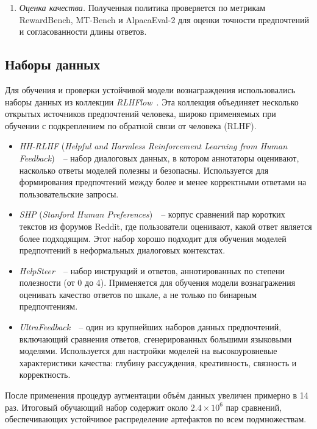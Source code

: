 \begin{enumerate}
  \item \emph{Оценка качества.}  
  Полученная политика проверяется по метрикам RewardBench, MT-Bench и AlpacaEval-2 для оценки точности предпочтений и согласованности длины ответов.
\end{enumerate}

\subsection{Наборы данных}

Для обучения и проверки устойчивой модели вознаграждения использовались наборы данных из коллекции \emph{RLHFlow}~\cite{li2024rlhflow}.  
Эта коллекция объединяет несколько открытых источников предпочтений человека, широко применяемых при обучении с подкреплением по обратной связи от человека (RLHF).

\begin{itemize}
  \item \emph{HH-RLHF} (\emph{Helpful and Harmless Reinforcement Learning from Human Feedback})~\cite{bai2022training}~-- набор диалоговых данных, в котором аннотаторы оценивают, насколько ответы моделей полезны и безопасны.  
  Используется для формирования предпочтений между более и менее корректными ответами на пользовательские запросы.  

  \item \emph{SHP} (\emph{Stanford Human Preferences})~\cite{ethayarajh2022shp}~-- корпус сравнений пар коротких текстов из форумов Reddit, где пользователи оценивают, какой ответ является более подходящим.  
  Этот набор хорошо подходит для обучения моделей предпочтений в неформальных диалоговых контекстах.  
  

  \item \emph{HelpSteer}~\cite{wang2023helpsteer}~-- набор инструкций и ответов, аннотированных по степени полезности (от 0 до 4).  
  Применяется для обучения модели вознагражения оценивать качество ответов по шкале, а не только по бинарным предпочтениям.  
  

  \item \emph{UltraFeedback}~\cite{cui2023ultrafeedback}~-- один из крупнейших наборов данных предпочтений, включающий сравнения ответов, сгенерированных большими языковыми моделями.  
  Используется для настройки моделей на высокоуровневые характеристики качества: глубину рассуждения, креативность, связность и корректность.  
\end{itemize}

После применения процедур аугментации объём данных увеличен примерно в 14 раз.  
Итоговый обучающий набор содержит около $2.4 \times 10^6$ пар сравнений, обеспечивающих устойчивое распределение артефактов по всем подмножествам.

